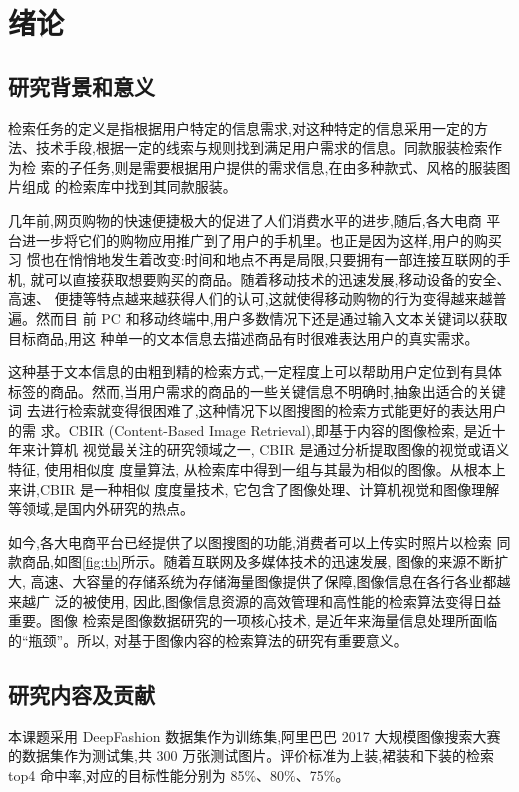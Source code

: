 \chapter{绪论}

\section{研究背景和意义}
检索任务的定义是指根据用户特定的信息需求,对这种特定的信息采用一定的方
法、技术手段,根据一定的线索与规则找到满足用户需求的信息。同款服装检索作为检
索的子任务,则是需要根据用户提供的需求信息,在由多种款式、风格的服装图片组成
的检索库中找到其同款服装。

几年前,网页购物的快速便捷极大的促进了人们消费水平的进步,随后,各大电商
平台进一步将它们的购物应用推广到了用户的手机里。也正是因为这样,用户的购买习
惯也在悄悄地发生着改变:时间和地点不再是局限,只要拥有一部连接互联网的手机,
就可以直接获取想要购买的商品。随着移动技术的迅速发展,移动设备的安全、高速、
便捷等特点越来越获得人们的认可,这就使得移动购物的行为变得越来越普遍。然而目
前 PC 和移动终端中,用户多数情况下还是通过输入文本关键词以获取目标商品,用这
种单一的文本信息去描述商品有时很难表达用户的真实需求。

这种基于文本信息的由粗到精的检索方式,一定程度上可以帮助用户定位到有具体
标签的商品。然而,当用户需求的商品的一些关键信息不明确时,抽象出适合的关键词
去进行检索就变得很困难了,这种情况下以图搜图的检索方式能更好的表达用户的需
求。CBIR (Content-Based Image Retrieval)\cite{kato1992sketch},即基于内容的图像检索, 是近十年来计算机
视觉最关注的研究领域之一, CBIR 是通过分析提取图像的视觉或语义特征, 使用相似度
度量算法, 从检索库中得到一组与其最为相似的图像。从根本上来讲,CBIR 是一种相似
度度量技术, 它包含了图像处理、计算机视觉和图像理解等领域,是国内外研究的热点。

如今,各大电商平台已经提供了以图搜图的功能,消费者可以上传实时照片以检索
同款商品,如图\ref{fig:tb}所示。随着互联网及多媒体技术的迅速发展, 图像的来源不断扩大,
高速、大容量的存储系统为存储海量图像提供了保障,图像信息在各行各业都越来越广
泛的被使用, 因此,图像信息资源的高效管理和高性能的检索算法变得日益重要。图像
检索是图像数据研究的一项核心技术, 是近年来海量信息处理所面临的“瓶颈”。所以,
对基于图像内容的检索算法的研究有重要意义。


\section{研究内容及贡献}
本课题采用 DeepFashion\cite{liu2016deepfashion} 数据集作为训练集,阿里巴巴 2017 大规模图像搜索大赛
的数据集作为测试集,共 300 万张测试图片。评价标准为上装,裙装和下装的检索 top4
命中率,对应的目标性能分别为 85\%、80\%、75\%。

